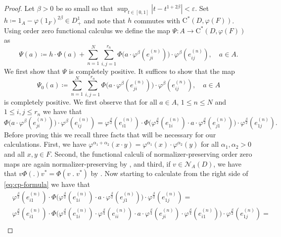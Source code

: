 \documentclass[11pt,a4paper]{amsart}
\theoremstyle{definition}
\numberwithin{equation}{section}
\newcommand{\mc}[1]{\mathcal{#1}}
\begin{document}
\begin{proof}
Let $\beta>0$ be so small so that $\sup_{t\in[0,1]}|t-t^{1+2\beta}|<\varepsilon$. Set $h\coloneqq 1_A-\varphi(1_F)^{2\beta}\in D_+^1$ and note that $h$ commutes with $\mathrm{C}^\ast(D,\varphi(F))$. Using order zero functional calculus \cite[Corollary~3.2]{WinZac09} we define the map $\Psi\colon A\to \mathrm{C}^\ast(D,\varphi(F))$ as
\begin{equation}\label{eq:cond-exp-def}
\Psi(a)\coloneqq h \cdot \Phi(a) + \sum_{n=1}^N\sum_{i,j=1}^{r_n}\Phi\big(a\cdot \varphi^\beta(e_{ji}^{(n)})\big) \cdot\varphi^\beta(e_{ij}^{(n)}),\quad a\in A.
\end{equation}
We first show that $\Psi$ is completely positive. It suffices to show that the map 
\begin{equation}
\Psi_0(a)\coloneqq\sum_{n=1}^N\sum_{i,j=1}^{r_n}\Phi\big(a\cdot \varphi^\beta(e_{ji}^{(n)})\big) \cdot\varphi^\beta(e_{ij}^{(n)}),\quad a\in A
\end{equation}
is completely positive. We first observe that for all $a\in A$, $1\le n\le N$ and $1\le i,j\le r_n$ we have that
\begin{equation}\label{eq:cp-formula}
\Phi\big(a\cdot \varphi^\beta(e_{ji}^{(n)})\big)\cdot \varphi^\beta(e_{ij}^{(n)}) = \varphi^\frac{\beta}{2}(e_{i1}^{(n)})\cdot \Phi\big(\varphi^\frac{\beta}{2}(e_{1i}^{(n)})\cdot a \cdot \varphi^\frac{\beta}{2}(e_{j1}^{(n)})\big) \cdot \varphi^\frac{\beta}{2}(e_{1j}^{(n)}).
\end{equation}
Before proving this we recall three facts that will be necessary for our calculations. First, we have $\varphi^{\alpha_1+\alpha_2}(x\cdot y)=\varphi^{\alpha_1}(x) \cdot \varphi^{\alpha_2}(y)$ for all $\alpha_1,\alpha_2>0$ and all $x,y\in F$. Second, the functional calculi of normalizer-preserving order zero maps are again normalizer-preserving by \cite[Remark~4.2]{KopWin24}, and third, if $v\in\mc{N}_A(D)$, we have that $v\Phi(.)v^*=\Phi(v\; . \; v^*)$ by \cite[Lemma~3.2]{CryNag17}. Now starting to calculate from the right side of \eqref{eq:cp-formula} we have that
\begin{align*}
&\varphi^\frac{\beta}{2}(e_{i1}^{(n)}) \cdot  \Phi\big(\varphi^\frac{\beta}{2}(e_{1i}^{(n)}) \cdot  a \cdot  \varphi^\frac{\beta}{2}(e_{j1}^{(n)})\big) \cdot  \varphi^\frac{\beta}{2}(e_{1j}^{(n)}) =\\
& \varphi^\frac{\beta}{2}(e_{i1}^{(n)}) \cdot \Phi\big(\varphi^\frac{\beta}{4}(e_{1i}^{(n)}) \cdot \varphi^\frac{\beta}{4}(e_{ii}^{(n)})\cdot a\cdot \varphi^\frac{\beta}{4}(e_{ji}^{(n)})\cdot \varphi^\frac{\beta}{4}(e_{i1}^{(n)})\big) \cdot \varphi^\frac{\beta}{2}(e_{1j}^{(n)}) =\\

\end{align*}
\end{proof}
\end{document}
